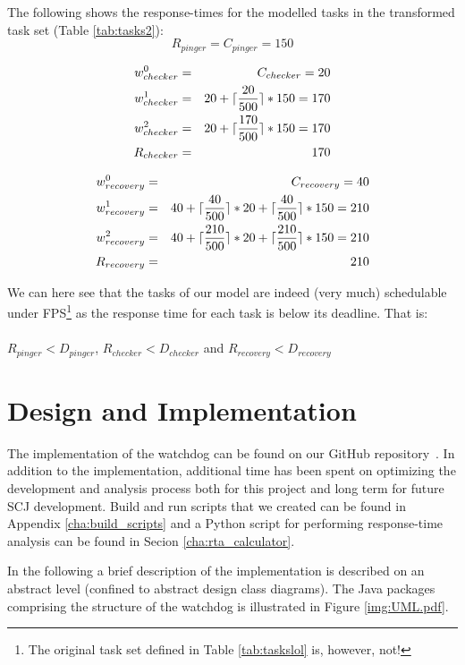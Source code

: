 The following shows the response-times for the modelled tasks in the transformed task set (Table \ref{tab:tasks2}):
\begin{equation}
\label{eq:pingerrta1}
     R_{pinger} = C_{pinger} = 150 
\end{equation}

\begin{eqnarray}
    w_{checker}^0 &=& C_{checker} = 20 \nonumber \\ 
    w_{checker}^1 &=& 20 + \lceil\frac{20}{500}\rceil*150 = 170 \nonumber \\ 
    w_{checker}^2 &=& 20 + \lceil\frac{170}{500}\rceil*150 = 170 \nonumber \\
    R_{checker} &=& 170
\end{eqnarray}

\begin{eqnarray}
    w_{recovery}^0 &=& C_{recovery} = 40 \nonumber \\ 
    w_{recovery}^1 &=& 40 + \lceil\frac{40}{500}\rceil*20 + \lceil\frac{40}{500}\rceil*150 = 210 \nonumber \\ 
    w_{recovery}^2 &=& 40 + \lceil\frac{210}{500}\rceil*20 + \lceil\frac{210}{500}\rceil*150 = 210 \nonumber \\
    R_{recovery} &=& 210
\end{eqnarray}

We can here see that the tasks of our model are indeed (very much) schedulable under FPS\footnote{The original task set defined in Table \ref{tab:taskslol} is, however, not!} as the response time for each task is below its deadline. That is: \\\\
$R_{pinger} < D_{pinger}$, $R_{checker} < D_{checker}$ and $R_{recovery} < D_{recovery}$

\section{Design and Implementation}
The implementation of the watchdog can be found on our GitHub repository~\cite{SW902e12:CSPinSCJ}. In addition to the implementation, additional time has been spent on optimizing the development and analysis process both for this project and long term for future SCJ development. Build and run scripts that we created can be found in Appendix \ref{cha:build_scripts} and a Python script for performing response-time analysis can be found in Secion \ref{cha:rta_calculator}.

In the following a brief description of the implementation is described on an abstract level (confined to abstract design class diagrams). The Java packages comprising the structure of the watchdog is illustrated in Figure \ref{img:UML.pdf}. 

